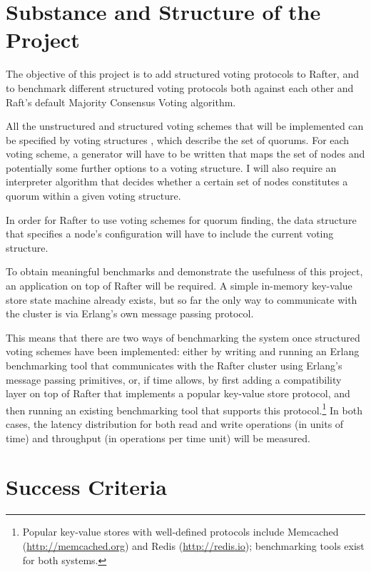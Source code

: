 \documentclass[12pt,chapterprefix=true,toc=bibliography,numbers=noendperiod,
               footnotes=multiple,twoside]{scrreprt}
\begin{document}
\section*{Substance and Structure of the Project%
  \label{substance-and-structure-of-the-project}%
}

The objective of this project is to add structured voting protocols to Rafter, and to benchmark different structured voting protocols both against each other and Raft's default Majority Consensus Voting algorithm.

All the unstructured and structured voting schemes that will be implemented can be specified by voting structures \autocite{voting}, which describe the set of quorums. For each voting scheme, a generator will have to be written that maps the set of nodes and potentially some further options to a voting structure. I will also require an interpreter algorithm that decides whether a certain set of nodes constitutes a quorum within a given voting structure.

In order for Rafter to use voting schemes for quorum finding, the data structure that specifies a node's configuration will have to include the current voting structure.

To obtain meaningful benchmarks and demonstrate the usefulness of this project, an application on top of Rafter will be required. A simple in-memory key-value store state machine already exists, but so far the only way to communicate with the cluster is via Erlang's own message passing protocol.

This means that there are two ways of benchmarking the system once structured voting schemes have been implemented: either by writing and running an Erlang benchmarking tool that communicates with the Rafter cluster using Erlang's message passing primitives, or, if time allows, by first adding a compatibility layer on top of Rafter that implements a popular key-value store protocol, and then running an existing benchmarking tool that supports this protocol.\footnote{Popular key-value stores with well-defined protocols include Memcached (\url{http://memcached.org}) and Redis (\url{http://redis.io}); benchmarking tools exist for both systems.} In both cases, the latency distribution for both read and write operations (in units of time) and throughput (in operations per time unit) will be measured.

\section*{Success Criteria%
  \label{success-criteria}%
}
\end{document}
